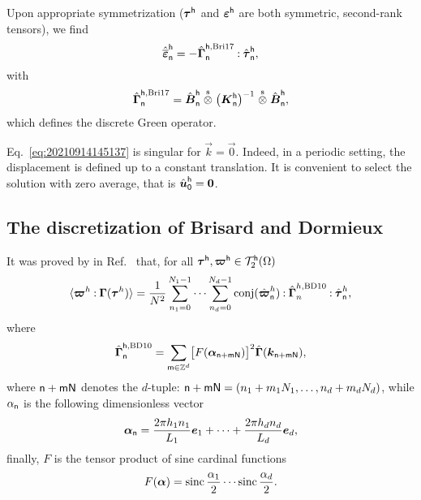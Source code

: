 Upon appropriate symmetrization (\(\boldsymbol\tau^\mathsf{h}\) and
\(\boldsymbol\varepsilon^\mathsf{h}\) are both symmetric, second-rank tensors), we find
\begin{equation}
  \hat{\overline{\boldsymbol\varepsilon}}_\mathsf{n}^\mathsf{h}=-\hat{\boldsymbol\Gamma}_\mathsf{n}^{\mathsf{h}, \text{Bri17}}\mathbin{\mathord{:}}\hat{\boldsymbol\tau}_\mathsf{n}^\mathsf{h},
\end{equation}
with
\begin{equation}
  \hat{\boldsymbol\Gamma}_\mathsf{n}^{\mathsf{h}, \text{Bri17}}
  =\hat{\boldsymbol B}_\mathsf{n}^\mathsf{h}
  \stackrel{\mathrm{s}}{\otimes}\bigl(\boldsymbol K_\mathsf{n}^\mathsf{h}\bigr)^{-1}
  \stackrel{\mathrm{s}}{\otimes}\hat{\boldsymbol B}_\mathsf{n}^\mathsf{h},
\end{equation}
which defines the discrete Green operator.

\begin{remark}
  Eq. \eqref{eq:20210914145137} is singular for \(\vec k = \vec 0\). Indeed, in a
  periodic setting, the displacement is defined up to a constant translation.  It
  is convenient to select the solution with zero average, that is
  \(\hat{\boldsymbol u}_\mathsf{0}^\mathsf{h}=\boldsymbol 0\).
\end{remark}

\subsection{The discretization of Brisard and Dormieux}

It was proved by in Ref.~\cite{bris2010a} that, for all
\(\boldsymbol\tau^{\mathsf h}, \boldsymbol\varpi^{\mathsf h}\in\mathcal T_2^{\mathsf h}(\Omega)\)
\begin{equation}
  \langle\boldsymbol\varpi^h\mathbin{\mathord{:}}\boldsymbol\Gamma(\boldsymbol\tau^h)\rangle=\frac1{N^2}
  \sum_{n_1=0}^{N_1-1}\cdots\sum_{n_d=0}^{N_d-1}\operatorname{conj}(\hat{\boldsymbol\varpi}_
  {\mathsf{n}}^h)\mathbin{\mathord{:}}\hat{\boldsymbol\Gamma}_n^{h, \mathrm{BD10}}\mathbin{\mathord{:}}
  \hat{\boldsymbol\tau}_{\mathsf{n}}^h,
\end{equation}
where
\begin{equation}
  \hat{\boldsymbol\Gamma}_{\mathsf n}^{\mathsf h, \mathrm{BD10}}
  =\sum_{\mathsf m\in\mathbb Z^d}\bigl[F(\boldsymbol\alpha_{\mathsf n+\mathsf m\mathsf N})
  \bigr]^2\hat{\boldsymbol\Gamma}(\boldsymbol k_{\mathsf n+\mathsf m\mathsf N}),
\end{equation}
where \(\mathsf{n+mN}\) denotes the \(d\)-tuple:
\(\mathsf n+\mathsf m\mathsf N=(n_1+m_1N_1, \ldots, n_d+m_dN_d)\), while
\(\alpha_{\mathsf{n}}\) is the following dimensionless vector
\begin{equation}
  \boldsymbol\alpha_{\mathsf{n}}
  =\frac{2\pi h_1n_1}{L_1}\boldsymbol e_1+\cdots+\frac{2\pi h_dn_d}{L_d}\boldsymbol e_d,
\end{equation}
finally, \(F\) is the tensor product of sine cardinal functions
\begin{equation}
  F(\boldsymbol\alpha)=\operatorname{sinc}\frac{\alpha_1}2\cdots\operatorname{sinc}\frac{\alpha_d}2.
\end{equation}

